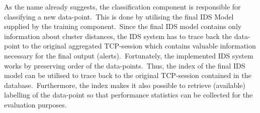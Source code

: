 		 As the name already suggests, the classification component is responsible for classifying a new data-point.\ This is done by utilising the final IDS Model supplied by the training component.\ Since the final IDS model contains only information about cluster distances, the IDS system has to trace back the data-point to the original aggregated TCP-session which contains valuable information necessary for the final output (alerts).\ Fortunately, the implemented IDS system works by preserving order of the data-points.\ Thus, the index of the final IDS model can be utilised to trace back to the original TCP-session contained in the database.\ Furthermore, the index makes it also possible to retrieve (available) labelling of the data-point so that performance statistics can be collected for the evaluation purposes.